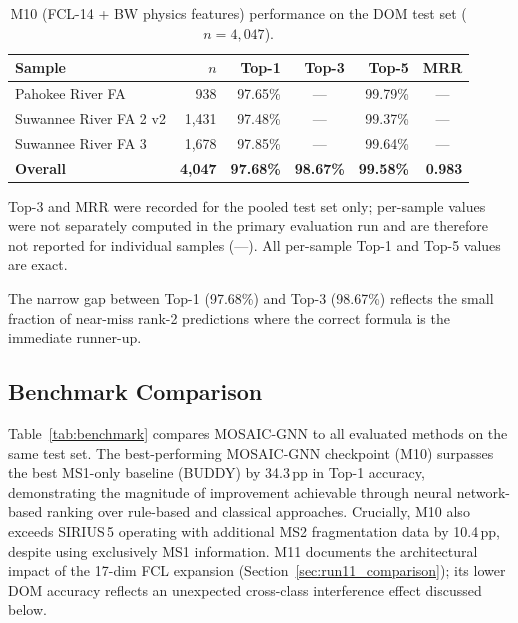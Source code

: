 \documentclass[journal=jcisd8]{achemso}
\begin{document}
\begin{table}[H]
\centering
\small
\begin{threeparttable}
\caption{M10 (FCL-14 + BW physics features) performance on the DOM test set ($n=4{,}047$).}
\label{tab:dom_main}
\footnotesize
\begin{tabular}{lrrrrr}
\toprule
\textbf{Sample} & \textbf{$n$} & \textbf{Top-1} & \textbf{Top-3}\tnote{$a$} & \textbf{Top-5} & \textbf{MRR}\tnote{$a$} \\
\midrule
Pahokee River FA       & 938     & 97.65\% & \multicolumn{1}{c}{---} & 99.79\% & \multicolumn{1}{c}{---} \\
Suwannee River FA 2 v2 & 1{,}431 & 97.48\% & \multicolumn{1}{c}{---} & 99.37\% & \multicolumn{1}{c}{---} \\
Suwannee River FA 3    & 1{,}678 & 97.85\% & \multicolumn{1}{c}{---} & 99.64\% & \multicolumn{1}{c}{---} \\
\midrule
\textbf{Overall}       & \textbf{4{,}047} & \textbf{97.68\%} & \textbf{98.67\%} & \textbf{99.58\%} & \textbf{0.983} \\
\bottomrule
\end{tabular}
\begin{tablenotes}
\footnotesize
\item[$a$] Top-3 and MRR were recorded for the pooled test set only; per-sample values
were not separately computed in the primary evaluation run and are therefore not
reported for individual samples (---). All per-sample Top-1 and Top-5 values are exact.
\end{tablenotes}
\end{threeparttable}
\end{table}

The narrow gap between Top-1 (97.68\%) and Top-3 (98.67\%) reflects the small fraction of
near-miss rank-2 predictions where the correct formula is the immediate runner-up.

\subsection{Benchmark Comparison}
\label{sec:benchmark}

Table~\ref{tab:benchmark} compares MOSAIC-GNN to all evaluated methods on the same test set.
The best-performing MOSAIC-GNN checkpoint (M10) surpasses the best MS1-only baseline
(BUDDY) by 34.3\,pp in Top-1 accuracy, demonstrating the magnitude of improvement
achievable through neural network-based ranking over rule-based and classical approaches.
Crucially, M10 also exceeds SIRIUS\,5 operating with additional MS2 fragmentation data
by 10.4\,pp, despite using exclusively MS1 information.
M11 documents the architectural impact of the 17-dim FCL expansion
(Section~\ref{sec:run11_comparison}); its lower DOM accuracy reflects an unexpected
cross-class interference effect discussed below.
\end{document}
